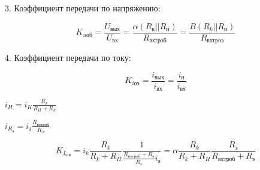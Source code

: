 3. Коэффициент передачи по напряжению:

$$
K_\textit{uоб}=\frac{U_\textit{вых}}{U_\textit{вх}}=\frac{\alpha(R_\textit{к}||R_\textit{н})}{R_\textit{вхтроб}}=\frac{B(R_\textit{k}||R_\textit{н})}{R_\textit{вхтроэ}}
$$

4. Коэффициент передачи по току:

$$K_\textit{iоэ}=\frac{i_\textit{вых}}{i_\textit{вх}}=\frac{i_\textit{н}}{i_\textit{вх}}$$

$i_H=i_K\frac{R_k}{R_H+R_k}$

$i_{R_\textit{э}}=i_\textit{э}\frac{R_\textit{вхтроб}}{R_\textit{Э}}$

$$
K_{I_\textit{ОБ}}=i_k\frac{R_k}{R_k+R_H}\frac{1}{\frac{R_\textit{вхтроб}+R_\textit{э}}{R_\textit{э}}i_\textit{э}}=\alpha \frac{R_k}{R_k+R_H} \frac{R_\textit{э}}{R_\textit{вхтроб}+R_\textit{э}}
$$

\pagebreak
